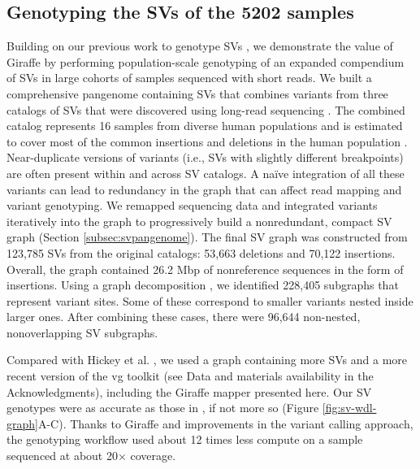 \documentclass[11pt]{ucscthesis}
\begin{document}
\subsection{Genotyping the SVs of the 5202 samples}
Building on our previous work to genotype SVs \cite{hickey_vgsv_2020}, we demonstrate the value of Giraffe by performing population-scale genotyping of an expanded compendium of SVs in large cohorts of samples sequenced with short reads.
We built a comprehensive pangenome containing SVs that combines variants from three catalogs of SVs that were discovered using long-read sequencing \cite{zook_robust_2020,chaisson_sv_2019,audano2019c}.
The combined catalog represents 16 samples from diverse human populations and is estimated to cover most of the common insertions and deletions in the human population \cite{audano2019c}.
Near-duplicate versions of variants (i.e., SVs with slightly different breakpoints) are often present within and across SV catalogs.
A naïve integration of all these variants can lead to redundancy in the graph that can affect read mapping and variant genotyping.
We remapped sequencing data and integrated variants iteratively into the graph to progressively build a nonredundant, compact SV graph (Section \ref{subsec:svpangenome}).
The final SV graph was constructed from 123,785 SVs from the original catalogs: 53,663 deletions and 70,122 insertions.
Overall, the graph contained 26.2 Mbp of nonreference sequences in the form of insertions. Using a graph decomposition \cite{paten_superbubbles_2018}, we identified 228,405 subgraphs that represent variant sites.
Some of these correspond to smaller variants nested inside larger ones. After combining these cases, there were 96,644 non-nested, nonoverlapping SV subgraphs.

Compared with Hickey et al. \cite{hickey_vgsv_2020}, we used a graph containing more SVs and a more recent version of the vg toolkit (see Data and materials availability in the Acknowledgments), including the Giraffe mapper presented here. Our SV genotypes were as accurate as those in \cite{hickey_vgsv_2020}, if not more so (Figure \ref{fig:sv-wdl-graph}A-C).
Thanks to Giraffe and improvements in the variant calling approach, the genotyping workflow used about 12 times less compute on a sample sequenced at about 20× coverage.
\end{document}
